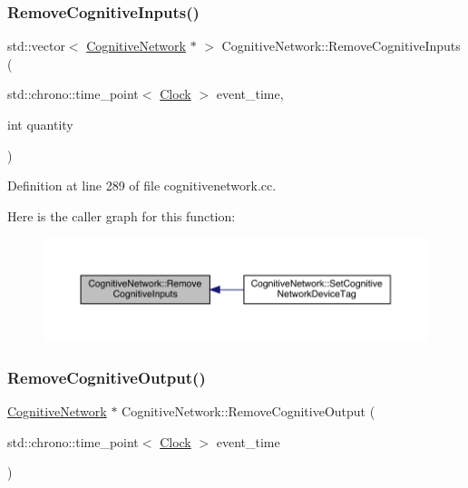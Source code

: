 \subsubsection{\texorpdfstring{Remove\+Cognitive\+Inputs()}{RemoveCognitiveInputs()}}
{\footnotesize\ttfamily std\+::vector$<$ \hyperlink{class_cognitive_network}{Cognitive\+Network} $\ast$ $>$ Cognitive\+Network\+::\+Remove\+Cognitive\+Inputs (\begin{DoxyParamCaption}\item[{std\+::chrono\+::time\+\_\+point$<$ \hyperlink{universe_8h_a0ef8d951d1ca5ab3cfaf7ab4c7a6fd80}{Clock} $>$}]{event\+\_\+time,  }\item[{int}]{quantity }\end{DoxyParamCaption})}



Definition at line 289 of file cognitivenetwork.\+cc.

Here is the caller graph for this function\+:
\nopagebreak
\begin{figure}[H]
\begin{center}
\leavevmode
\includegraphics[width=350pt]{class_cognitive_network_aaaf93e7c732b1e1e81060f82ff73c93a_icgraph}
\end{center}
\end{figure}
\mbox{\label{class_cognitive_network_a9874b11ac465c84ccf7baab0a40fb84e}} 
\subsubsection{\texorpdfstring{Remove\+Cognitive\+Output()}{RemoveCognitiveOutput()}}
{\footnotesize\ttfamily \hyperlink{class_cognitive_network}{Cognitive\+Network} $\ast$ Cognitive\+Network\+::\+Remove\+Cognitive\+Output (\begin{DoxyParamCaption}\item[{std\+::chrono\+::time\+\_\+point$<$ \hyperlink{universe_8h_a0ef8d951d1ca5ab3cfaf7ab4c7a6fd80}{Clock} $>$}]{event\+\_\+time }\end{DoxyParamCaption})}



